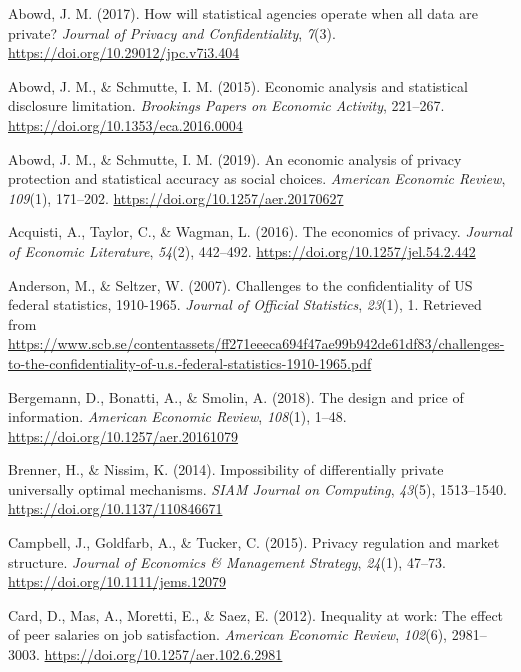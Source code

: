 \documentclass[]{article}
\begin{document}
\hypertarget{ref-Abowd:JPC:2017}{}
Abowd, J. M. (2017). How will statistical agencies operate when all data
are private? \emph{Journal of Privacy and Confidentiality}, \emph{7}(3).
\url{https://doi.org/10.29012/jpc.v7i3.404}

\hypertarget{ref-abowdschmutteBPEA2015}{}
Abowd, J. M., \& Schmutte, I. M. (2015). Economic analysis and
statistical disclosure limitation. \emph{Brookings Papers on Economic
Activity}, 221--267. \url{https://doi.org/10.1353/eca.2016.0004}

\hypertarget{ref-AbowdSchmutte:Privacy:AER}{}
Abowd, J. M., \& Schmutte, I. M. (2019). An economic analysis of privacy
protection and statistical accuracy as social choices. \emph{American
Economic Review}, \emph{109}(1), 171--202.
\url{https://doi.org/10.1257/aer.20170627}

\hypertarget{ref-acquisti:taylor:wagman:2015}{}
Acquisti, A., Taylor, C., \& Wagman, L. (2016). The economics of
privacy. \emph{Journal of Economic Literature}, \emph{54}(2), 442--492.
\url{https://doi.org/10.1257/jel.54.2.442}

\hypertarget{ref-anderson:challenges:JOS:2007}{}
Anderson, M., \& Seltzer, W. (2007). Challenges to the confidentiality
of US federal statistics, 1910-1965. \emph{Journal of Official
Statistics}, \emph{23}(1), 1. Retrieved from
\url{https://www.scb.se/contentassets/ff271eeeca694f47ae99b942de61df83/challenges-to-the-confidentiality-of-u.s.-federal-statistics-1910-1965.pdf}

\hypertarget{ref-10.1257ux2faer.20161079}{}
Bergemann, D., Bonatti, A., \& Smolin, A. (2018). The design and price
of information. \emph{American Economic Review}, \emph{108}(1), 1--48.
\url{https://doi.org/10.1257/aer.20161079}

\hypertarget{ref-BrennerNissim:Impossibility:SIAM:2014}{}
Brenner, H., \& Nissim, K. (2014). Impossibility of differentially
private universally optimal mechanisms. \emph{SIAM Journal on
Computing}, \emph{43}(5), 1513--1540.
\url{https://doi.org/10.1137/110846671}

\hypertarget{ref-Campbell:Privacy:JEMS}{}
Campbell, J., Goldfarb, A., \& Tucker, C. (2015). Privacy regulation and
market structure. \emph{Journal of Economics \& Management Strategy},
\emph{24}(1), 47--73. \url{https://doi.org/10.1111/jems.12079}

\hypertarget{ref-CardAER2012}{}
Card, D., Mas, A., Moretti, E., \& Saez, E. (2012). Inequality at work:
The effect of peer salaries on job satisfaction. \emph{American Economic
Review}, \emph{102}(6), 2981--3003.
\url{https://doi.org/10.1257/aer.102.6.2981}
\end{document}

